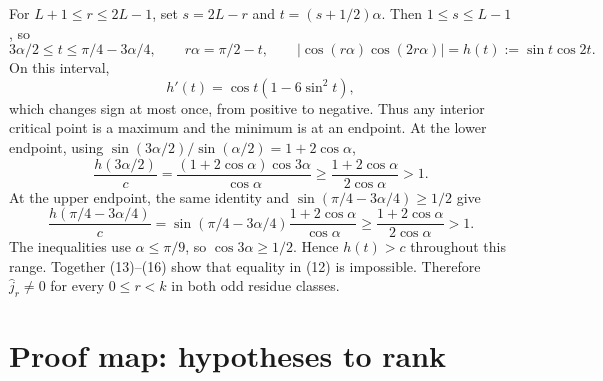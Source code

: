\documentclass[11pt]{article}
\begin{document}
For $L+1\leq r\leq2L-1$, set $s=2L-r$ and $t=(s+1/2)\alpha$. Then $1\leq s\leq L-1$, so
\[
 3\alpha/2\leq t\leq\pi/4-3\alpha/4,
 \qquad r\alpha=\pi/2-t,
 \qquad |\cos(r\alpha)\cos(2r\alpha)|=h(t):=\sin t\cos2t.
\]
On this interval,
\[
 h'(t)=\cos t(1-6\sin^2t),
\]
which changes sign at most once, from positive to negative. Thus any interior critical point is a maximum and the minimum is at an endpoint. At the lower endpoint, using $\sin(3\alpha/2)/\sin(\alpha/2)=1+2\cos\alpha$,
\[
 \frac{h(3\alpha/2)}{c}
 =\frac{(1+2\cos\alpha)\cos3\alpha}{\cos\alpha}
 \geq\frac{1+2\cos\alpha}{2\cos\alpha}>1. \tag{15}
\]
At the upper endpoint, the same identity and $\sin(\pi/4-3\alpha/4)\geq1/2$ give
\[
 \frac{h(\pi/4-3\alpha/4)}{c}
 =\sin(\pi/4-3\alpha/4)\frac{1+2\cos\alpha}{\cos\alpha}
 \geq\frac{1+2\cos\alpha}{2\cos\alpha}>1. \tag{16}
\]
The inequalities use $\alpha\leq\pi/9$, so $\cos3\alpha\geq1/2$. Hence $h(t)>c$ throughout this range. Together (13)--(16) show that equality in (12) is impossible. Therefore $\widehat j_r\ne0$ for every $0\leq r<k$ in both odd residue classes.

\section{Proof map: hypotheses to rank}
\end{document}
